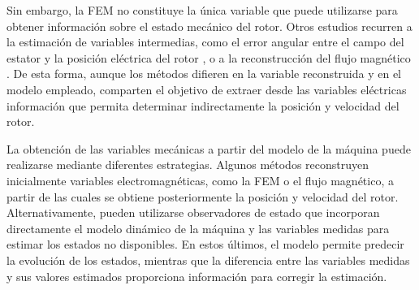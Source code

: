 Sin embargo, la FEM no constituye la única variable que puede utilizarse para obtener información sobre el estado mecánico del rotor. Otros estudios recurren a la estimación de variables intermedias, como el error angular entre el campo del estator y la posición eléctrica del rotor \cite{derammelaereSensorlessLoadAngle2017}, o a la reconstrucción del flujo magnético \cite{horvathLoadTorquePermanent2023}. De esta forma, aunque los métodos difieren en la variable reconstruida y en el modelo empleado, comparten el objetivo de extraer desde las variables eléctricas información que permita determinar indirectamente la posición y velocidad del rotor.


%
%
%
%
%

La obtención de las variables mecánicas a partir del modelo de la máquina puede realizarse mediante diferentes estrategias. Algunos métodos reconstruyen inicialmente variables electromagnéticas, como la FEM o el flujo magnético, a partir de las cuales se obtiene posteriormente la posición y velocidad del rotor. Alternativamente, pueden utilizarse observadores de estado que incorporan directamente el modelo dinámico de la máquina y las variables medidas para estimar los estados no disponibles. En estos últimos, el modelo permite predecir la evolución de los estados, mientras que la diferencia entre las variables medidas y sus valores estimados proporciona información para corregir la estimación.

%
%
%
%
%
%
%
%

